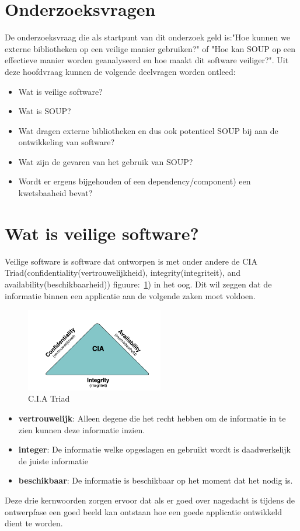 \section{Onderzoeksvragen} \label{sec:SOUPOnderzoeksvragen}
De onderzoeksvraag die als startpunt van dit onderzoek geld is:"Hoe kunnen we externe bibliotheken op een veilige manier gebruiken?" of "Hoe kan SOUP op een effectieve manier worden geanalyseerd en hoe maakt dit software veiliger?". Uit deze hoofdvraag kunnen de volgende deelvragen worden ontleed:
\begin{itemize}
    \item Wat is veilige software?
    \item Wat is SOUP?
    \item Wat dragen externe bibliotheken en dus ook potentieel SOUP bij aan de ontwikkeling van software?
    \item Wat zijn de gevaren van het gebruik van SOUP?
    \item Wordt er ergens bijgehouden of een dependency/component) een kwetsbaaheid bevat?
\end{itemize}



\section{Wat is veilige software?}
Veilige software is software dat ontworpen is met onder andere de CIA Triad(confidentiality(vertrouwelijkheid), integrity(integriteit), and availability(beschikbaarheid)) figuure:~\ref{fig:CIA}) in het oog. Dit wil zeggen dat de informatie binnen een applicatie aan de volgende zaken moet voldoen.
\begin{figure}[H]
    \centering
    \includegraphics[width=6cm]{gfx/CIA}
    \caption{C.I.A Triad}
    \label{fig:CIA}
\end{figure}

\begin{itemize}
    \item \textbf{vertrouwelijk}: Alleen degene die het recht hebben om de informatie in te zien kunnen deze informatie inzien.
    \item \textbf{integer}: De informatie welke opgeslagen en gebruikt wordt is daadwerkelijk de juiste informatie
    \item \textbf{beschikbaar}: De informatie is beschikbaar op het moment dat het nodig is.
\end{itemize}
Deze drie kernwoorden zorgen ervoor dat als er goed over nagedacht is tijdens de ontwerpfase een goed beeld kan ontstaan hoe een goede applicatie ontwikkeld dient te worden.

